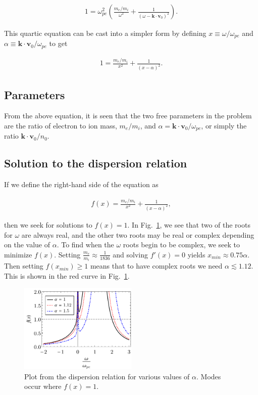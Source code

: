 \documentclass[12pt]{article}
\newcommand{\mb}{\mathbf}
\begin{document}
\begin{align*}
1 = \omega_{pe}^2 \left(\frac{m_e/m_i}{\omega^2} + \frac{1}{(\omega - \mb{k} \cdot \mb{v}_0)^2}\right).
\end{align*}

This quartic equation can be cast into a simpler form by defining $x \equiv \omega/\omega_{pe}$ and $\alpha \equiv \mb{k} \cdot \mb{v}_0/\omega_{pe}$ to get

\begin{align*}
1 = \frac{m_e/m_i}{x^2} + \frac{1}{(x-\alpha)^2}.
\end{align*}

\subsection*{Parameters}

From the above equation, it is seen that the two free parameters in the problem are the ratio of electron to ion mass, $m_e/m_i$, and $\alpha = \mb{k} \cdot \mb{v}_0/\omega_{pe}$, or simply the ratio $\mb{k} \cdot \mb{v}_0/n_0$.

\subsection*{Solution to the dispersion relation}

If we define the right-hand side of the equation as

\begin{align*}
f(x) = \frac{m_e/m_i}{x^2} + \frac{1}{(x-\alpha)^2},
\end{align*}

then we seek for solutions to $f(x) = 1$. In Fig.~\ref{fig:Buneman}, we see that two of the roots for $\omega$ are always real, and the other two roots may be real or complex depending on the value of $\alpha$. To find when the $\omega$ roots begin to be complex, we seek to minimize $f(x)$. Setting $\frac{m_e}{m_i} \approx \frac{1}{1836}$ and solving $f'(x)=0$ yields $x_{min} \approx 0.75\alpha$. Then setting $f(x_{min}) \geq 1$ means that to have complex roots we need $\alpha \lesssim 1.12$. This is shown in the red curve in Fig.~\ref{fig:Buneman}.

\begin{figure}
	\centering
	\includegraphics[width=0.5\textwidth]{two_stream_disp}
	\caption{\label{fig:Buneman} Plot from the dispersion relation for various values of $\alpha$. Modes occur where $f(x)=1$.}
\end{figure}
\end{document}
